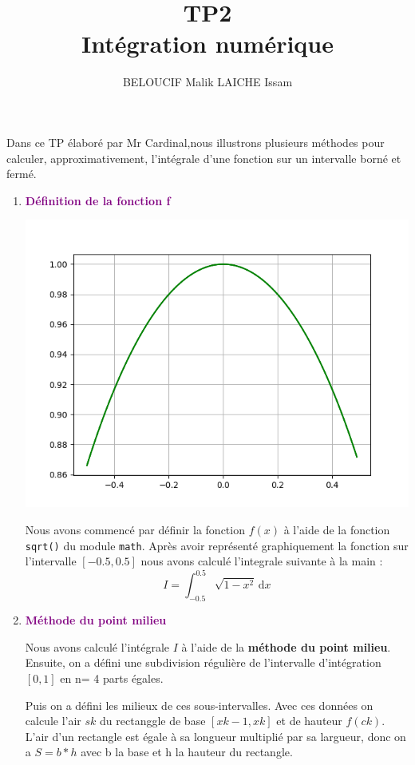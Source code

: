 \documentclass{article}
\title{TP2\\ Intégration numérique}
\author{BELOUCIF Malik LAICHE Issam}
\begin{document}
\maketitle

	Dans ce TP élaboré par Mr Cardinal,nous illustrons plusieurs méthodes pour calculer, approximativement, l'intégrale d'une fonction sur un intervalle borné et fermé.

\begin{enumerate}

\item{\bf\textcolor{purple} {Définition de la fonction f}}\vskip 0.7cm

\begin{center}
	\includegraphics[scale=0.5]{Courbef.png}
\end{center}

Nous avons commencé par définir la fonction $f(x)$ à l'aide de la fonction \texttt{sqrt()} du module \texttt{math}. 
Après avoir représenté graphiquement la fonction sur l'intervalle $[-0.5, 0.5]$ nous avons calculé l'integrale suivante à la main : $$I=\int_{-0.5}^{0.5} \sqrt{1-x^2} \, \mathrm{d}x $$

\item{\bf\textcolor{purple} {Méthode du point milieu}}\vskip 0.7cm

Nous avons calculé l'intégrale $I$ à l'aide de la  {\bf méthode du point milieu}.
Ensuite, on a défini une subdivision régulière de l'intervalle d'intégration $[0,1]$ en n= 4 parts égales. 

Puis on a défini les milieux de ces sous-intervalles. Avec ces données on calcule l'air $s{k}$ du rectanggle de base $[x{k-1},x{k}]$ et de hauteur $f(c{k})$. L'air d'un rectangle est égale à sa longueur multiplié par sa largueur, donc on a $S= b*h$ avec b la base et h la hauteur du rectangle.
\\


\end{enumerate}
\end{document}
